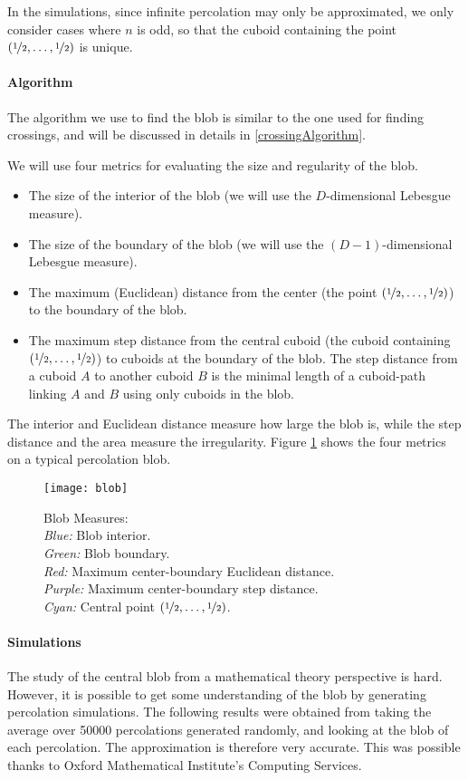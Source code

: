 In the simulations, since infinite percolation may only be approximated, we only consider cases where $n$ is odd, so that the cuboid containing the point $(\nicefrac{1}{2}, \dots, \nicefrac{1}{2})$ is unique.

\paragraph{Algorithm}
The algorithm we use to find the blob is similar to the one used for finding crossings, and will be discussed in details in \ref{crossingAlgorithm}.

We will use four metrics for evaluating the size and regularity of the blob.
\begin{itemize}
	\item The size of the interior of the blob (we will use the $D$-dimensional Lebesgue measure).
	\item The size of the boundary of the blob (we will use the $(D-1)$-dimensional Lebesgue measure).
	\item The maximum (Euclidean) distance from the center (the point $(\nicefrac{1}{2},\dots,\nicefrac{1}{2})$) to the boundary of the blob.
	\item The maximum step distance from the central cuboid (the cuboid containing $(\nicefrac{1}{2},\dots,\nicefrac{1}{2})$) to cuboids at the boundary of the blob. The step distance from a cuboid $A$ to another cuboid $B$ is the minimal length of a cuboid-path linking $A$ and $B$ using only cuboids in the blob.
\end{itemize}
The interior and Euclidean distance measure how large the blob is, while the step distance and the area measure the irregularity.
Figure \ref{fig:blobMeasures} shows the four metrics on a typical percolation blob.

\begin{figure}[!h]
	\centering
	\texttt{[image: blob]}
	\caption{Blob Measures:\\
		\textit{Blue:} Blob interior.\\
		\textit{Green:} Blob boundary.\\
		\textit{Red:} Maximum center-boundary Euclidean distance.\\
		\textit{Purple:} Maximum center-boundary step distance.\\
		\textit{Cyan:} Central point $(\nicefrac{1}{2},\dots,\nicefrac{1}{2})$.}
	\label{fig:blobMeasures}
\end{figure}

\paragraph{Simulations}\label{blob}
The study of the central blob from a mathematical theory perspective is hard.
However, it is possible to get some understanding of the blob by generating percolation simulations.
The following results were obtained from taking the average over 50000 percolations generated randomly, and looking at the blob of each percolation.
The approximation is therefore very accurate.
This was possible thanks to Oxford Mathematical Institute's Computing Services.

